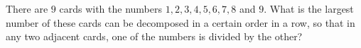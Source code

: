 There are $9$ cards with the numbers $1, 2, 3, 4, 5, 6, 7, 8$ and $9$. What is the largest number of these cards can be decomposed in a certain order in a row, so that in any two adjacent cards, one of the numbers is divided by the other?